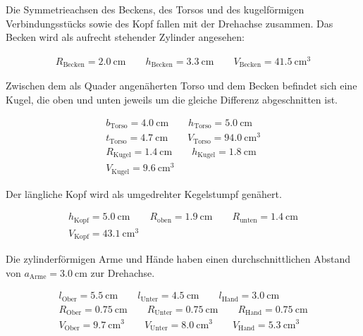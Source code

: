 Die Symmetrieachsen des Beckens, des Torsos und des kugelförmigen Verbindungsstücks sowie des Kopf fallen mit der Drehachse 
zusammen. 
Das Becken wird als aufrecht stehender Zylinder angesehen:

\begin{gather}
    R_\text{Becken}=\SI{2.0}{\centi\meter} \quad \quad 
    h_\text{Becken}=\SI{3.3}{\centi\meter} \quad \quad
    V_\text{Becken}=\SI{41.5}{\centi\meter\tothe{3}}
\end{gather}

Zwischen dem als Quader angenäherten Torso und dem Becken befindet sich eine Kugel, die oben und unten jeweils um die 
gleiche Differenz abgeschnitten ist. 

\begin{gather}
    b_\text{Torso}=\SI{4.0}{\centi\meter} \quad \quad 
    h_\text{Torso}=\SI{5.0}{\centi\meter} \\
    t_\text{Torso}=\SI{4.7}{\centi\meter} \quad \quad 
    V_\text{Torso}=\SI{94.0}{\centi\meter\tothe{3}} \\
    R_\text{Kugel}=\SI{1.4}{\centi\meter} \quad \quad 
    h_\text{Kugel}=\SI{1.8}{\centi\meter} \\
    V_\text{Kugel}= \SI{9.6}{\centi\meter\tothe{3}}
\end{gather}

Der längliche Kopf wird als umgedrehter Kegelstumpf genähert. 

\begin{gather}
    h_\text{Kopf}=\SI{5.0}{\centi\meter} \quad \quad
    R_\text{oben}=\SI{1.9}{\centi\meter} \quad \quad 
    R_\text{unten}=\SI{1.4}{\centi\meter} \\
    V_\text{Kopf}=\SI{43.1}{\centi\meter\tothe{3}}
\end{gather}

Die zylinderförmigen Arme und Hände haben einen durchschnittlichen Abstand von ${a_\text{Arme}=\SI{3.0}{\centi\meter}}$ zur Drehachse. 

\begin{gather}
    l_\text{Ober}=\SI{5.5}{\centi\meter} \quad \quad 
    l_\text{Unter}=\SI{4.5}{\centi\meter} \quad \quad 
    l_\text{Hand}=\SI{3.0}{\centi\meter} \\
    R_\text{Ober}=\SI{0.75}{\centi\meter} \quad \quad 
    R_\text{Unter}=\SI{0.75}{\centi\meter} \quad \quad 
    R_\text{Hand}=\SI{0.75}{\centi\meter} \\
    V_\text{Ober}=\SI{9.7}{\centi\meter\tothe{3}} \quad \quad 
    V_\text{Unter}=\SI{8.0}{\centi\meter\tothe{3}}\quad \quad 
    V_\text{Hand}=\SI{5.3}{\centi\meter\tothe{3}}
\end{gather}

